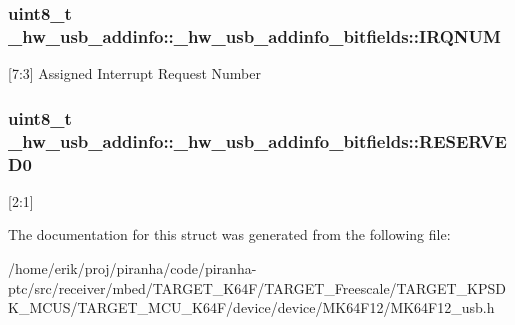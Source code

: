 \subsubsection[{\texorpdfstring{I\+R\+Q\+N\+UM}{IRQNUM}}]{\setlength{\rightskip}{0pt plus 5cm}uint8\+\_\+t \+\_\+hw\+\_\+usb\+\_\+addinfo\+::\+\_\+hw\+\_\+usb\+\_\+addinfo\+\_\+bitfields\+::\+I\+R\+Q\+N\+UM}\hypertarget{struct__hw__usb__addinfo_1_1__hw__usb__addinfo__bitfields_a877bee0eb7a8ae88fd3c253e5842ca65}{}\label{struct__hw__usb__addinfo_1_1__hw__usb__addinfo__bitfields_a877bee0eb7a8ae88fd3c253e5842ca65}
\mbox{[}7\+:3\mbox{]} Assigned Interrupt Request Number 
\subsubsection[{\texorpdfstring{R\+E\+S\+E\+R\+V\+E\+D0}{RESERVED0}}]{\setlength{\rightskip}{0pt plus 5cm}uint8\+\_\+t \+\_\+hw\+\_\+usb\+\_\+addinfo\+::\+\_\+hw\+\_\+usb\+\_\+addinfo\+\_\+bitfields\+::\+R\+E\+S\+E\+R\+V\+E\+D0}\hypertarget{struct__hw__usb__addinfo_1_1__hw__usb__addinfo__bitfields_a460cce60c4801f6073624bb7126dfc54}{}\label{struct__hw__usb__addinfo_1_1__hw__usb__addinfo__bitfields_a460cce60c4801f6073624bb7126dfc54}
\mbox{[}2\+:1\mbox{]} 

The documentation for this struct was generated from the following file\+:\begin{DoxyCompactItemize}
\item 
/home/erik/proj/piranha/code/piranha-\/ptc/src/receiver/mbed/\+T\+A\+R\+G\+E\+T\+\_\+\+K64\+F/\+T\+A\+R\+G\+E\+T\+\_\+\+Freescale/\+T\+A\+R\+G\+E\+T\+\_\+\+K\+P\+S\+D\+K\+\_\+\+M\+C\+U\+S/\+T\+A\+R\+G\+E\+T\+\_\+\+M\+C\+U\+\_\+\+K64\+F/device/device/\+M\+K64\+F12/M\+K64\+F12\+\_\+usb.\+h\end{DoxyCompactItemize}
